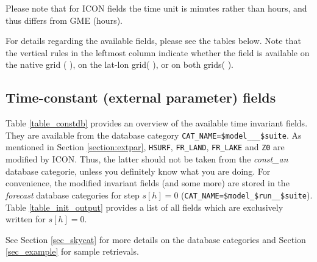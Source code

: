 Please note that for ICON fields the time unit is minutes rather than hours, and thus differs from GME (hours). 

For details regarding the available fields, please see the tables below. Note that the vertical rules in the leftmost column indicate whether the field is 
available on the native grid ($\,$\markRed$\,$), on the lat-lon grid($\,$\markBlue$\,$), or on both grids($\,$\markRed\markBlue$\,$). 


\subsection{Time-constant (external parameter) fields}

Table \ref{table_constdb} provides an overview of the available time invariant fields. They are available from the database category 
\texttt{CAT\_NAME=\$model\_\_\_\$suite}. As mentioned in Section \ref{section:extpar}, \texttt{HSURF}, 
\texttt{FR\_LAND}, \texttt{FR\_LAKE} and \texttt{Z0} are modified by ICON. Thus, the latter should not be taken from the \emph{const\_an} 
database categorie, unless you definitely know what you are doing. For convenience, the modified invariant fields (and some more) 
are stored in the \emph{forecast} database categories for step $s[h]=0$ (\texttt{CAT\_NAME=\$model\_\$run\_\_\$suite}). Table 
\ref{table_init_output} provides a list of all fields which are exclusively written for $s[h]=0$.

See Section \ref{sec_skycat} for more details on the database categories and Section \ref{sec_example} for sample retrievals.
 



